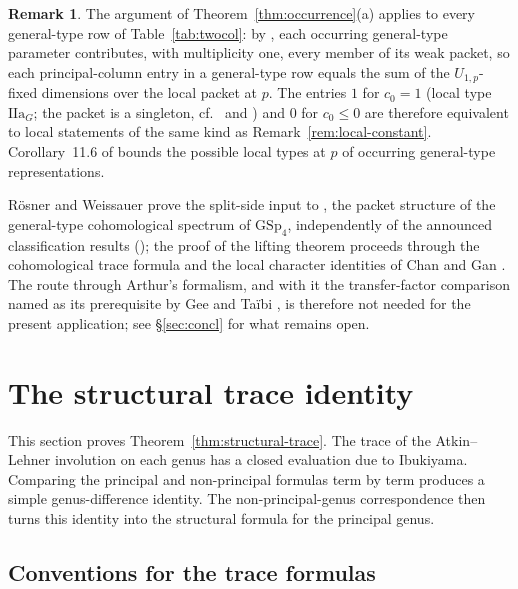 \documentclass[11pt]{amsart}
\theoremstyle{plain}
\theoremstyle{definition}
\newtheorem{remark}[theorem]{Remark}
\newcommand{\GSp}{\mathrm{GSp}}
\begin{document}
	\begin{remark}\label{rem:other-rows}
		The argument of Theorem~\ref{thm:occurrence}\textup{(a)} applies to
		every general-type row of Table~\ref{tab:twocol}: by
		\cite[Thm.~11.4]{RoesnerWeissauer2021}, each occurring general-type
		parameter contributes, with multiplicity one, every member of its
		weak packet, so each principal-column entry in a general-type row
		equals the sum of the $U_{1,p}$-fixed dimensions over the local
		packet at $p$. The entries $1$ for $c_0=1$ (local type
		$\mathrm{IIa}_G$; the packet is a singleton, cf.\
		\cite[\S3]{Schmidt2018} and \cite[Table~3]{RoesnerWeissauer2021})
		and $0$ for $c_0\le0$ are therefore equivalent to local statements
		of the same kind as Remark~\ref{rem:local-constant}.
		Corollary~11.6 of \cite{RoesnerWeissauer2021} bounds the possible
		local types at $p$ of occurring general-type representations.
	\end{remark}
	
	R\"osner and Weissauer prove the split-side input to
	\cite[Thm.~11.4]{RoesnerWeissauer2021}, the packet structure of the
	general-type cohomological spectrum of $\GSp_4$, independently of the
	announced classification results
	(\cite[\S10]{RoesnerWeissauer2021}); the proof of the lifting theorem
	proceeds through the cohomological trace formula and the local
	character identities of Chan and Gan \cite{ChanGan2015}. The route
	through Arthur's formalism, and with it the transfer-factor comparison
	named as its prerequisite by Gee and Ta\"ibi
	\cite[Rem.~7.4.8]{GeeTaibi}, is therefore not needed for the present
	application; see \S\ref{sec:concl} for what remains open.
	
	
	\section{The structural trace identity}
	\label{sec:trace}
	
	This section proves Theorem~\ref{thm:structural-trace}. The trace of the
	Atkin--Lehner involution on each genus has a closed evaluation due to
	Ibukiyama. Comparing the principal and non-principal formulas term by term
	produces a simple genus-difference identity. The non-principal-genus
	correspondence then turns this identity into the structural formula for the
	principal genus.
	
	\subsection{Conventions for the trace formulas}
	\label{ss:trace-conventions}
	
\end{document}

